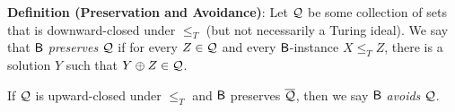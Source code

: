 \documentclass{amsart}
\begin{document}
	
	
	
	
	
	
	\noindent \textbf{Definition (Preservation and Avoidance)}: Let $\mathcal{Q}$ be some collection of sets that is downward-closed under $\leq_T$ (but not necessarily a Turing ideal). We say that $\sf{B}$ \textit{preserves} $\mathcal{Q}$ if for every $Z\in \mathcal{Q}$ and every $\sf{B}$-instance $X\leq_T Z$, there is a solution $Y$ such that $Y\oplus Z\in \mathcal{Q}$.
	
	If $\mathcal{Q}$ is upward-closed under $\leq_T$ and $\sf{B}$ preserves $\overline{\mathcal{Q}}$, then we say $\sf{B}$ \textit{avoids} $\mathcal{Q}$.\\
	
\end{document}
